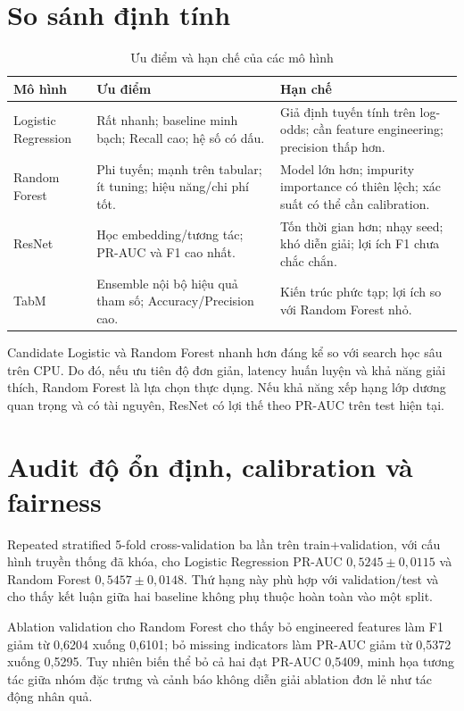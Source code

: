 \documentclass[12pt,a4paper,oneside]{report}
\begin{document}
\section{So sánh định tính}

\begin{table}[H]
\centering
\caption{Ưu điểm và hạn chế của các mô hình}\label{tab:qualitative}
\begin{tabularx}{\textwidth}{l X X}
\toprule
\textbf{Mô hình} & \textbf{Ưu điểm} & \textbf{Hạn chế} \\
\midrule
Logistic Regression & Rất nhanh; baseline minh bạch; Recall cao; hệ số có dấu. & Giả định tuyến tính trên log-odds; cần feature engineering; precision thấp hơn. \\
Random Forest & Phi tuyến; mạnh trên tabular; ít tuning; hiệu năng/chi phí tốt. & Model lớn hơn; impurity importance có thiên lệch; xác suất có thể cần calibration. \\
ResNet & Học embedding/tương tác; PR-AUC và F1 cao nhất. & Tốn thời gian hơn; nhạy seed; khó diễn giải; lợi ích F1 chưa chắc chắn. \\
TabM & Ensemble nội bộ hiệu quả tham số; Accuracy/Precision cao. & Kiến trúc phức tạp; lợi ích so với Random Forest nhỏ. \\
\bottomrule
\end{tabularx}
\end{table}

Candidate Logistic và Random Forest nhanh hơn đáng kể so với search học sâu trên CPU. Do đó, nếu ưu tiên độ đơn giản, latency huấn luyện và khả năng giải thích, Random Forest là lựa chọn thực dụng. Nếu khả năng xếp hạng lớp dương quan trọng và có tài nguyên, ResNet có lợi thế theo PR-AUC trên test hiện tại.

\section{Audit độ ổn định, calibration và fairness}

Repeated stratified 5-fold cross-validation ba lần trên train+validation, với cấu hình truyền thống đã khóa, cho Logistic Regression PR-AUC $0{,}5245\pm0{,}0115$ và Random Forest $0{,}5457\pm0{,}0148$. Thứ hạng này phù hợp với validation/test và cho thấy kết luận giữa hai baseline không phụ thuộc hoàn toàn vào một split.

Ablation validation cho Random Forest cho thấy bỏ engineered features làm F1 giảm từ 0,6204 xuống 0,6101; bỏ missing indicators làm PR-AUC giảm từ 0,5372 xuống 0,5295. Tuy nhiên biến thể bỏ cả hai đạt PR-AUC 0,5409, minh họa tương tác giữa nhóm đặc trưng và cảnh báo không diễn giải ablation đơn lẻ như tác động nhân quả.
\end{document}
